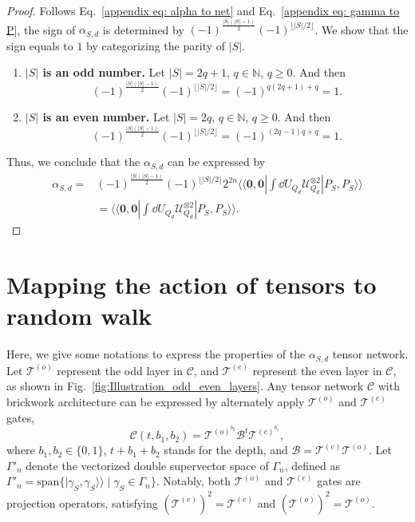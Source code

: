 \documentclass[showpacs,twocolumn,aps,prx,long bibliography,superscriptaddress,notitlepage]{revtex4-1}
\newcommand{\supket}[1]{|#1 \rangle\rangle}
\newcommand{\supbra}[1]{\langle\langle #1 |}
\newcommand{\floor}[1]{\lfloor #1 \rfloor}
\newcommand{\Tcal}{\mathcal{T}}
\begin{document}
\begin{proof}
    Follows Eq.~\eqref{appendix eq: alpha to net} and Eq.~\eqref{appendix eq: gamma to P}, 
    the sign of $\alpha_{S,d}$ is determined by $(-1)^{\frac{|S|(|S|-1)}{2}} (-1)^{\floor{|S|/2}}$. 
    We show that the sign equals to $1$ by categorizing the parity of $|S|$. 
    \begin{enumerate}
        \item \textbf{$|S|$ is an odd number.} Let $|S| = 2q+1$, $ q\in \mathbb{N}$, $q\geq 0$. And then
        \begin{equation}
            (-1)^{\frac{|S|(|S|-1)}{2}} (-1)^{\floor{|S|/2}} = (-1)^{q(2q+1)+q} = 1.
        \end{equation}
        \item \textbf{$|S|$ is an even number.} Let $|S| = 2q$, $ q\in \mathbb{N}$, $q\geq 0$. And then
        \begin{equation}
            (-1)^{\frac{|S|(|S|-1)}{2}} (-1)^{\floor{|S|/2}} = (-1)^{(2q-1)q+q} = 1.
        \end{equation}
    \end{enumerate}
Thus, we conclude that the $\alpha_{S,d}$ can be expressed by 
\begin{align}
    \alpha_{S,d}=& (-1)^{\frac{|S|(|S|-1)}{2}} (-1)^{\floor{|S|/2}}  2^{2n}  \supbra{\bm 0,\bm 0}  \int\dd U_{Q_d} \mathcal{U}_{Q_d}^{\otimes 2} \supket{P_S,P_S}\\
    &= \supbra{\bm 0,\bm 0}  \int\dd U_{Q_d} \mathcal{U}_{Q_d}^{\otimes 2} \supket{P_S,P_S} .
\end{align}
\end{proof}




\section{Mapping the action of tensors to random walk}
\label{sec: Mapping the action of tensors to random walk}

Here, we give some notations to express the properties of the $\alpha_{S,d}$ tensor network. Let $\Tcal^{(o)}$ represent the odd layer in $\mathcal{C}$, and $\Tcal^{(e)}$ represent the even layer in $\mathcal{C}$, as shown in Fig.~\ref{fig:Illustration_odd_even_layers}. 
Any tensor network $\mathcal{C}$ with brickwork architecture can be expressed by alternately apply $\Tcal^{(o)}$ and $\Tcal^{(e)}$ gates, 
\begin{equation}
\mathcal{C} \left(t, b_1, b_2\right)=\Tcal^{(o)^{b_2}}\mathcal{B}^t \Tcal^{(e)^{b_1}}, 
\end{equation}
where $b_1, b_2 \in\{0,1\}$, $t+b_1+b_2$ stands for the depth, and $\mathcal{B = }\Tcal^{(e)}\Tcal^{(o)}$. 
Let $\Gamma'_n$ denote the vectorized double supervector space of $\Gamma_n$, defined as $\Gamma'_n = \text{span}\{\supket{\gamma_S, \gamma_S} \mid \gamma_S \in \Gamma_n \}$. Notably, both $\Tcal^{(o)}$ and $\Tcal^{(e)}$ gates are projection operators, satisfying $(\Tcal^{(e)})^2 = \Tcal^{(e)}$ and $(\Tcal^{(o)})^2 = \Tcal^{(o)}$. 
\end{document}
